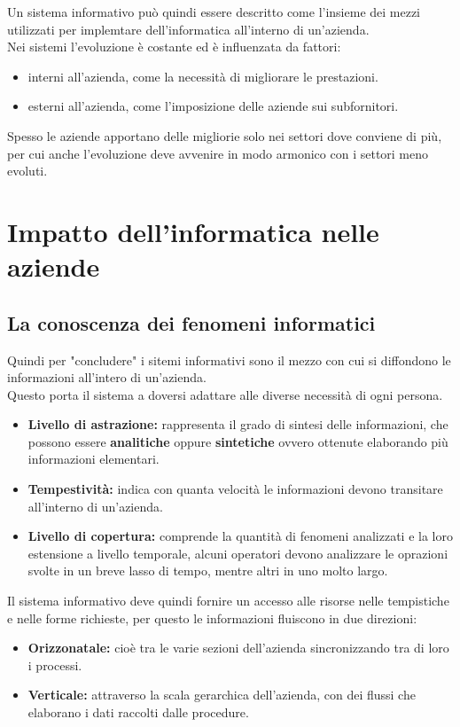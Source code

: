 \documentclass{book}
\begin{document}
    Un sistema informativo può quindi essere descritto come l'insieme dei mezzi utilizzati per implemtare dell'informatica all'interno di un'azienda.\\
    Nei sistemi l'evoluzione è costante ed è influenzata da fattori:
    \begin{itemize}
        \item interni all'azienda, come la necessità di migliorare le prestazioni.
        \item esterni all'azienda, come l'imposizione delle aziende sui subfornitori.
    \end{itemize}
    Spesso le aziende apportano delle migliorie solo nei settori dove conviene di più, per cui anche l'evoluzione deve avvenire in modo armonico con i settori meno evoluti.
    
    \section{Impatto dell'informatica nelle aziende}
    \subsection{La conoscenza dei fenomeni informatici}
    Quindi per "concludere" i sitemi informativi sono il mezzo con cui si diffondono le informazioni all'intero di un'azienda.\\
    Questo porta il sistema a doversi adattare alle diverse necessità di ogni persona.
    \begin{itemize}
        \item \textbf{Livello di astrazione:} rappresenta il grado di sintesi delle informazioni, che possono essere \textbf{analitiche} oppure \textbf{sintetiche} ovvero ottenute elaborando più informazioni elementari.
        \item \textbf{Tempestività:} indica con quanta velocità le informazioni devono transitare all'interno di un'azienda.
        \item \textbf{Livello di copertura:} comprende la quantità di fenomeni analizzati e la loro estensione a livello temporale, alcuni operatori devono analizzare le oprazioni svolte in un breve lasso di tempo, mentre altri in uno molto largo. 
    \end{itemize}
    Il sistema informativo deve quindi fornire un accesso alle risorse nelle tempistiche e nelle forme richieste, per questo le informazioni fluiscono in due direzioni:
    \begin{itemize}
        \item \textbf{Orizzonatale:} cioè tra le varie sezioni dell'azienda sincronizzando tra di loro i processi.
        \item \textbf{Verticale:} attraverso la scala gerarchica dell'azienda, con dei flussi che elaborano i dati raccolti dalle procedure.
    \end{itemize}
\end{document}
